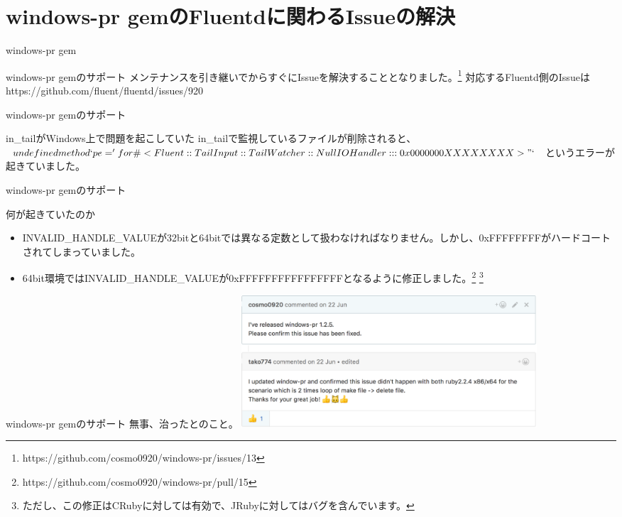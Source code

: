 \documentclass[12pt, unicode]{beamer}
\begin{document}
\section[]{windows-pr gemのFluentdに関わるIssueの解決}
\begin{frame}{windows-pr gem}
  \begin{block}{windows-pr gemのサポート}
メンテナンスを引き継いでからすぐにIssueを解決することとなりました。\footnote[frame]{https://github.com/cosmo0920/windows-pr/issues/13}\newline
対応するFluentd側のIssueは https://github.com/fluent/fluentd/issues/920
  \end{block}
\end{frame}

\begin{frame}{windows-pr gemのサポート}
  \begin{block}{in\_tailがWindows上で問題を起こしていた}
    in\_tailで監視しているファイルが削除されると、\newline
    $undefined method `pe=' for \#<Fluent::TailInput::TailWatcher::NullIOHandler:::0x0000000XXXXXXXX>"`$
    というエラーが起きていました。
  \end{block}
\end{frame}

\begin{frame}{windows-pr gemのサポート}
  \begin{block}{何が起きていたのか}
    \begin{itemize}
    \item INVALID\_HANDLE\_VALUEが32bitと64bitでは異なる定数として扱わなければなりません。しかし、0xFFFFFFFFがハードコートされてしまっていました。
    \item 64bit環境ではINVALID\_HANDLE\_VALUEが0xFFFFFFFFFFFFFFFFとなるように修正しました。\footnote[frame]{https://github.com/cosmo0920/windows-pr/pull/15} \footnote[frame]{ただし、この修正はCRubyに対しては有効で、JRubyに対してはバグを含んでいます。}
    \end{itemize}
  \end{block}
\end{frame}

\begin{frame}{windows-pr gemのサポート}
  無事、治ったとのこと。
  \includegraphics[clip,width=11cm]{images/fixed_in_tail_invalid_handle_in_windows.png}
\end{frame}
\end{document}
